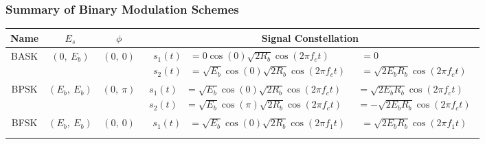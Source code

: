 \documentclass{article}
\begin{document}
\subsubsection{Summary of Binary Modulation Schemes}
\begin{table}[H]
    \centering
    \begin{tabular}{cccc}
        \toprule
        \textbf{Name} &                       \(E_s\) &                    \(\phi\) & \textbf{Signal Constellation} \\
        \midrule
        BASK          &   \(\left( 0,\: E_b \right)\) &   \(\left( 0,\: 0 \right)\) & \parbox{10cm}{\begin{align*}
                                                                                                      s_1\left( t \right) & = 0 \cos{\left( 0 \right)} \sqrt{2R_b} \cos{\left( 2 \pi f_c t \right)}          && = 0   \\
                                                                                                      s_2\left( t \right) & = \sqrt{E_b} \cos{\left( 0 \right)} \sqrt{2R_b} \cos{\left( 2 \pi f_c t \right)} && = \sqrt{2 E_b R_b} \cos{\left( 2 \pi f_c t \right)}
                                                                                                   \end{align*}} \\
        BPSK          & \(\left( E_b,\: E_b \right)\) & \(\left( 0,\: \pi \right)\) & \parbox{10cm}{\begin{align*}
                                                                                                      s_1\left( t \right) & = \sqrt{E_b} \cos{\left( 0 \right)} \sqrt{2R_b} \cos{\left( 2 \pi f_c t \right)}   && = \sqrt{2 E_b R_b} \cos{\left( 2 \pi f_c t \right)} \\
                                                                                                      s_2\left( t \right) & = \sqrt{E_b} \cos{\left( \pi \right)} \sqrt{2R_b} \cos{\left( 2 \pi f_c t \right)} && = -\sqrt{2 E_b R_b} \cos{\left( 2 \pi f_c t \right)}
                                                                                                   \end{align*}} \\
        BFSK          & \(\left( E_b,\: E_b \right)\) &   \(\left( 0,\: 0 \right)\) & \parbox{10cm}{\begin{align*}
                                                                                                      s_1\left( t \right) & = \sqrt{E_b} \cos{\left( 0 \right)} \sqrt{2R_b} \cos{\left( 2 \pi f_1 t \right)} && = \sqrt{2 E_b R_b} \cos{\left( 2 \pi f_1 t \right)} \\

\end{align*}}
\end{tabular}
\end{table}
\end{document}
